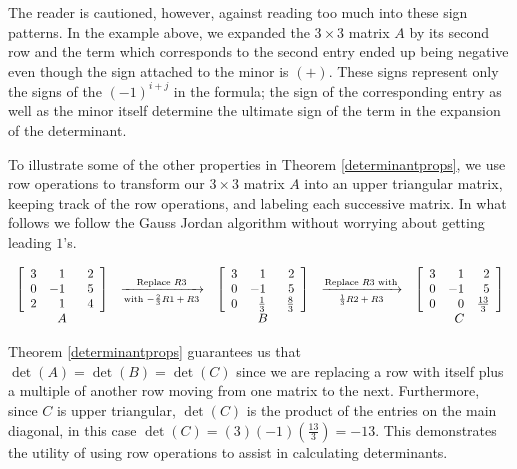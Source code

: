 \documentclass{ximera}
\begin{document}
The reader is cautioned, however, against reading too much into these sign patterns.  In the example above, we expanded the $3 \times 3$ matrix $A$ by its second row and the term which corresponds to the second entry ended up being negative even though the sign attached to the minor is $(+)$.  These signs represent only the signs of the $(-1)^{i+j}$ in the formula;  the sign of the corresponding entry as well as the minor itself determine the ultimate sign of the term in the expansion of the determinant.

 

To illustrate some of the other properties in  Theorem \ref{determinantprops}, we use row operations to transform our $3 \times 3$ matrix $A$ into an upper triangular matrix, keeping track of the row operations, and labeling each successive matrix.  In what follows we follow the Gauss Jordan algorithm without worrying about getting leading $1$'s.


\[ \begin{array}{ccccc}

\left[ \begin{array}{rrr} 
3 &  1 & \hphantom{-}2 \\ 
0 & -1 & 5 \\ 
2 & 1 & 4 \\ 
\end{array} \right]

&
\xrightarrow[\text{with $-\frac{2}{3}R1+R3$}]{\text{Replace $R3$}}
&

\left[ \begin{array}{rrr} 
3 &  1 & \hphantom{-}2 \\ 
0 & -1 & 5 \\
0 & \frac{1}{3} & \frac{8}{3} \\ 
\end{array} \right]
&
\xrightarrow[\text{$\frac{1}{3}R2+R3$}]{\text{Replace $R3$ with}}
&

\left[ \begin{array}{rrr} 
3 &  1 & 2 \\ 
0 & -1 & 5 \\
0 & 0 & \frac{13}{3} \\ 
\end{array} \right] \\

A & & B & & C \\

\end{array}\]

Theorem \ref{determinantprops} guarantees us that $\det(A) = \det(B) = \det(C)$ since we are replacing a row with itself plus a multiple of another row moving from one matrix to the next.  Furthermore, since $C$ is upper triangular, $\det(C)$ is the product of the entries on the main diagonal, in this case  $\det(C) = (3)(-1)\left(\frac{13}{3}\right) = -13$.  This demonstrates the utility of using row operations to assist in calculating determinants.  
\end{document}
